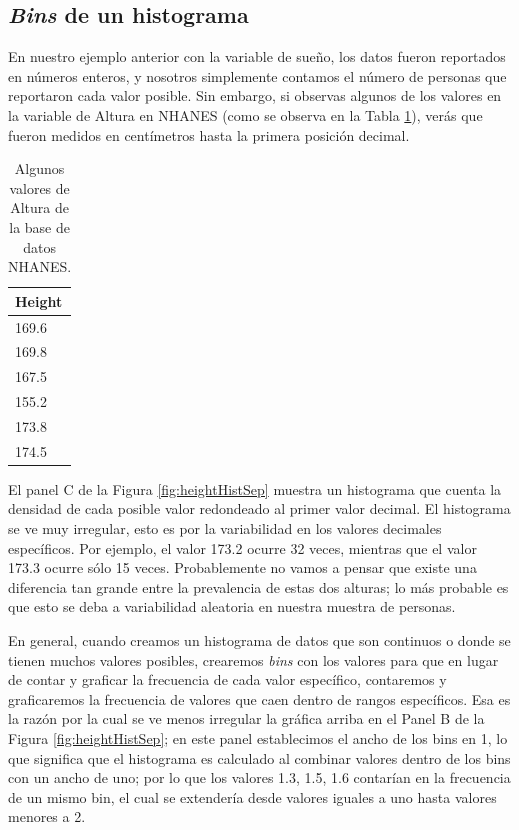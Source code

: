 \documentclass[
  12pt,
]{book}
\begin{document}
\hypertarget{bins-de-un-histograma}{%
\subsection{\texorpdfstring{\emph{Bins} de un histograma}{Bins de un histograma}}\label{bins-de-un-histograma}}

En nuestro ejemplo anterior con la variable de sueño, los datos fueron reportados en números enteros, y nosotros simplemente contamos el número de personas que reportaron cada valor posible. Sin embargo, si observas algunos de los valores en la variable de Altura en NHANES (como se observa en la Tabla \ref{tab:heightVals}), verás que fueron medidos en centímetros hasta la primera posición decimal.

\begin{table}

\caption{\label{tab:heightVals}Algunos valores de Altura de la base de datos NHANES.}
\centering
\begin{tabular}[t]{l}
\hline
Height\\
\hline
169.6\\
\hline
169.8\\
\hline
167.5\\
\hline
155.2\\
\hline
173.8\\
\hline
174.5\\
\hline
\end{tabular}
\end{table}

El panel C de la Figura \ref{fig:heightHistSep} muestra un histograma que cuenta la densidad de cada posible valor redondeado al primer valor decimal. El histograma se ve muy irregular, esto es por la variabilidad en los valores decimales específicos. Por ejemplo, el valor 173.2 ocurre 32 veces, mientras que el valor 173.3 ocurre sólo 15 veces. Probablemente no vamos a pensar que existe una diferencia tan grande entre la prevalencia de estas dos alturas; lo más probable es que esto se deba a variabilidad aleatoria en nuestra muestra de personas.

En general, cuando creamos un histograma de datos que son continuos o donde se tienen muchos valores posibles, crearemos \emph{bins} con los valores para que en lugar de contar y graficar la frecuencia de cada valor específico, contaremos y graficaremos la frecuencia de valores que caen dentro de rangos específicos. Esa es la razón por la cual se ve menos irregular la gráfica arriba en el Panel B de la Figura \ref{fig:heightHistSep}; en este panel establecimos el ancho de los bins en 1, lo que significa que el histograma es calculado al combinar valores dentro de los bins con un ancho de uno; por lo que los valores 1.3, 1.5, 1.6 contarían en la frecuencia de un mismo bin, el cual se extendería desde valores iguales a uno hasta valores menores a 2.
\end{document}
